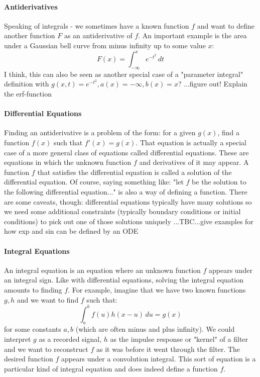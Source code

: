 \paragraph{Antiderivatives}
Speaking of integrals - we sometimes have a known function $f$ and want to define another function $F$ as an antiderivative of $f$. An important example is the area under a Gaussian bell curve from minus infinity up to some value $x$:
\begin{equation}
 F(x)  = \int_{-\infty}^{x} e^{-t^2}  \, dt
\end{equation}
I think, this can also be seen as another special case of a "parameter integral" definition with $g(x,t)=e^{-t^2}, a(x)= -\infty, b(x)=x$? ...figure out! Explain the erf-function

\paragraph{Differential Equations}
Finding an antiderivative is a problem of the form: for a given $g(x)$, find a function $f(x)$ such that $f'(x) = g(x)$. That equation is actually a special case of a more general class of equations called differential equations. These are equations in which the unknown function $f$ and derivatives of it may appear. A function $f$ that satisfies the differential equation is called a solution of the differential equation. Of course, saying something like: "let $f$ be the solution to the following differential equation..." is also a way of defining a function. There are some caveats, though: differential equations typically have many solutions so we need some additional constraints (typically boundary conditions or initial conditions) to pick out one of those solutions uniquely ...TBC...give examples for how exp and sin can be defined by an ODE


\paragraph{Integral Equations}
An integral equation is an equation where an unknown function $f$ appears under an integral sign. Like with differential equations, solving the integral equation amounts to finding $f$. For example, imagine that we have two known functions $g, h$ and we want to find $f$ such that:
\begin{equation}
 \int_a^b f(u) h(x-u) \, du = g(x)
\end{equation}
for some constants $a,b$ (which are often minus and plus infinity). We could interpret $g$ as a recorded signal, $h$ as the impulse response or "kernel" of a filter and we want to reconstruct $f$ as it was before it went through the filter. The desired function $f$ appears under a convolution integral. This sort of equation is a particular kind of integral equation and does indeed define a function $f$.

